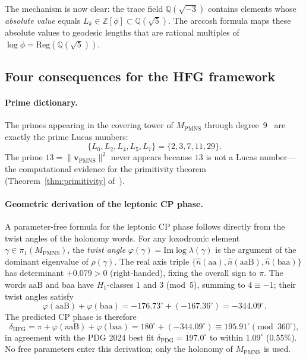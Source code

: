 ﻿\documentclass[12pt]{article}
\theoremstyle{definition}
\begin{document}
\medskip
The mechanism is now clear: the trace field $\mathbb{Q}(\sqrt{-3})$
contains elements whose \emph{absolute value} equals $L_k \in
\mathbb{Z}[\phi] \subset \mathbb{Q}(\sqrt{5})$. The arccosh formula
maps these absolute values to geodesic lengths that are rational
multiples of $\log\phi = \mathrm{Reg}(\mathbb{Q}(\sqrt{5}))$.

\subsection*{Four consequences for the HFG framework}

\paragraph{Prime dictionary.}
The primes appearing in the covering tower of $M_\mathrm{PMNS}$
through degree~9~\cite{Gentry:Covering} are exactly the prime Lucas
numbers:
\[
  \{L_0, L_2, L_4, L_5, L_7\} = \{2, 3, 7, 11, 29\}.
\]
The prime $13 = \|\mathbf{v}_\mathrm{PMNS}\|^2$ never appears because
$13$ is not a Lucas number---the computational evidence for the
primitivity theorem (Theorem~\ref{thm:primitivity} of~\cite{Gentry:Covering}).


\paragraph{Geometric derivation of the leptonic CP phase.}
\label{par:cp_geometric}
A parameter-free formula for the leptonic CP phase follows directly from
the twist angles of the holonomy words. For any loxodromic element
$\gamma\in\pi_1(M_\mathrm{PMNS})$, the \emph{twist angle}
$\varphi(\gamma) = \mathrm{Im}\log\lambda(\gamma)$ is the argument of the
dominant eigenvalue of $\rho(\gamma)$. The real axis triple
$\{\hat{n}(\mathrm{aa}),\hat{n}(\mathrm{aaB}),\hat{n}(\mathrm{baa})\}$
has determinant $+0.079>0$ (right-handed), fixing the overall sign to $\pi$.
The words aaB and baa have $H_1$-classes $1$ and $3$ (mod~5), summing to
$4\equiv -1$; their twist angles satisfy
\[
  \varphi(\mathrm{aaB}) + \varphi(\mathrm{baa})
  = -176.73^\circ + (-167.36^\circ) = -344.09^\circ.
\]
The predicted CP phase is therefore
\[
  \boxed{\delta_\mathrm{HFG}
    = \pi + \varphi(\mathrm{aaB}) + \varphi(\mathrm{baa})
    = 180^\circ + (-344.09^\circ)
    \equiv 195.91^\circ \pmod{360^\circ},}
\]
in agreement with the PDG 2024 best fit $\delta_\mathrm{PDG} = 197.0^\circ$
to within $1.09^\circ$ ($0.55\%$). No free parameters enter this derivation;
only the holonomy of $M_\mathrm{PMNS}$ is used.
\end{document}

